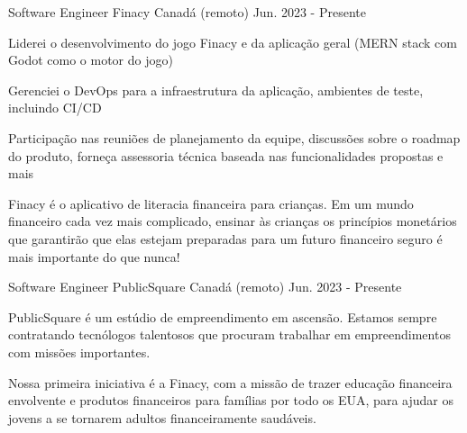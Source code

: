 

\begin{cventries}

\cventry
{Software Engineer} %
{Finacy} %
{Canadá (remoto)} %
{Jun. 2023 - Presente} %
{
  \begin{cvitems} %
    \item{Liderei o desenvolvimento do jogo Finacy e da aplicação geral (MERN stack com Godot como o motor do jogo)}
    \item {Gerenciei o DevOps para a infraestrutura da aplicação, ambientes de teste, incluindo CI/CD}
    \item {Participação nas reuniões de planejamento da equipe, discussões sobre o roadmap do produto, forneça assessoria técnica baseada nas funcionalidades propostas e mais}
    \item {Finacy é o aplicativo de literacia financeira para crianças. Em um mundo financeiro cada vez mais complicado, ensinar às crianças os princípios monetários que garantirão que elas estejam preparadas para um futuro financeiro seguro é mais importante do que nunca!}
  \end{cvitems}
}

\cventry
{Software Engineer} %
{PublicSquare} %
{Canadá (remoto)} %
{Jun. 2023 - Presente} %
{
  \begin{cvitems} %
    \item {PublicSquare é um estúdio de empreendimento em ascensão. Estamos sempre contratando tecnólogos talentosos que procuram trabalhar em empreendimentos com missões importantes.}
    \item {Nossa primeira iniciativa é a Finacy, com a missão de trazer educação financeira envolvente e produtos financeiros para famílias por todo os EUA, para ajudar os jovens a se tornarem adultos financeiramente saudáveis.}
  \end{cvitems}
}




\end{cventries}
